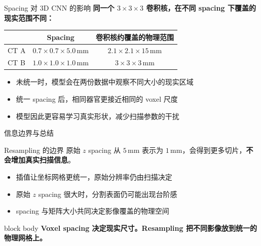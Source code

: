 \documentclass[aspectratio=169,14pt]{beamer}
\newcommand{\unit}[1]{\,\mathrm{#1}}
\newcommand{\takeaway}[1]{%
  \begin{beamercolorbox}[wd=\linewidth,sep=.22cm,center,rounded=true,shadow=true]{block body}
    \textcolor{BeamerDeep}{\textbf{#1}}
  \end{beamercolorbox}
}
\begin{document}
\begin{frame}{Spacing 对 3D CNN 的影响}
  \textbf{同一个 $3\times3\times3$ 卷积核，在不同 spacing 下覆盖的现实范围不同：}

  \vspace{0.24cm}
  \centering
  \renewcommand{\arraystretch}{1.38}
  \begin{tabular}{lcc}
    \toprule
      & Spacing & 卷积核约覆盖的物理范围\\
    \midrule
    CT A & $0.7\times0.7\times5.0\unit{mm}$ & $2.1\times2.1\times15\unit{mm}$\\
    CT B & $1.0\times1.0\times1.0\unit{mm}$ & $3\times3\times3\unit{mm}$\\
    \bottomrule
  \end{tabular}

  \vspace{0.38cm}
  \begin{itemize}
    \item 未统一时，模型会在两份数据中观察不同大小的现实区域
    \item 统一 spacing 后，相同器官更接近相同的 voxel 尺度
    \item 模型因此更容易学习真实形状，减少扫描参数的干扰
  \end{itemize}
\end{frame}

\begin{frame}{信息边界与总结}
  \begin{alertblock}{Resampling 的边界}
    \centering
    原始 $z$ spacing 从 $5\unit{mm}$ 表示为 $1\unit{mm}$，会得到更多切片，\textbf{不会增加真实扫描信息}。
  \end{alertblock}

  \vspace{0.22cm}
  \begin{itemize}
    \item 插值让坐标网格更统一，原始分辨率仍由扫描决定
    \item 原始 $z$ spacing 很大时，分割表面仍可能出现台阶感
    \item spacing 与矩阵大小共同决定影像覆盖的物理空间
  \end{itemize}

  \vfill
  \takeaway{Voxel spacing 决定现实尺寸。Resampling 把不同影像放到统一的物理网格上。}
\end{frame}
\end{document}

